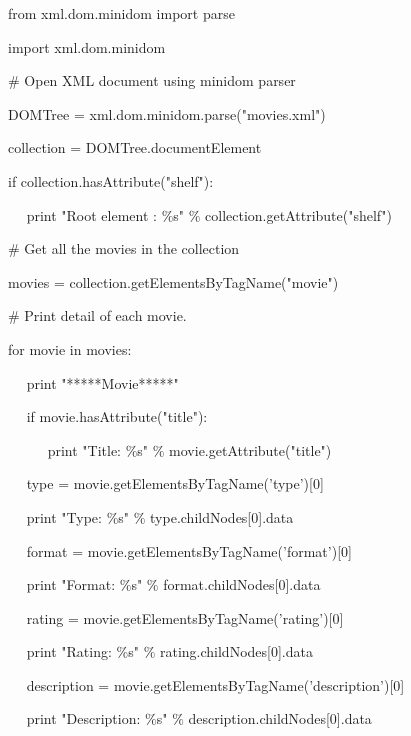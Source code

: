 \vspace{12pt}
\noindent 
from xml.dom.minidom import parse \par
\noindent 
import xml.dom.minidom \par
\vspace{12pt}
\noindent 
 $  \#  $ Open XML document using minidom parser \par
\noindent 
DOMTree = xml.dom.minidom.parse("movies.xml") \par
\noindent 
collection = DOMTree.documentElement \par
\noindent 
if collection.hasAttribute("shelf"): \par
\noindent 
~~ print "Root element :  $  \%  $s"  $  \%  $ collection.getAttribute("shelf") \par
\vspace{12pt}
\noindent 
 $  \#  $ Get all the movies in the collection \par
\noindent 
movies = collection.getElementsByTagName("movie") \par
\vspace{12pt}
\noindent 
 $  \#  $ Print detail of each movie. \par
\noindent 
for movie in movies: \par
\noindent 
~~ print "*****Movie*****" \par
\noindent 
~~ if movie.hasAttribute("title"): \par
\noindent 
~~~~~ print "Title:  $  \%  $s"  $  \%  $ movie.getAttribute("title") \par
\vspace{12pt}
\noindent 
~~ type = movie.getElementsByTagName('type')[0] \par
\noindent 
~~ print "Type:  $  \%  $s"  $  \%  $ type.childNodes[0].data \par
\noindent 
~~ format = movie.getElementsByTagName('format')[0] \par
\noindent 
~~ print "Format:  $  \%  $s"  $  \%  $ format.childNodes[0].data \par
\noindent 
~~ rating = movie.getElementsByTagName('rating')[0] \par
\noindent 
~~ print "Rating:  $  \%  $s"  $  \%  $ rating.childNodes[0].data \par
\noindent 
~~ description = movie.getElementsByTagName('description')[0] \par
\noindent 
~~ print "Description:  $  \%  $s"  $  \%  $ description.childNodes[0].data \par
\vspace{12pt}
